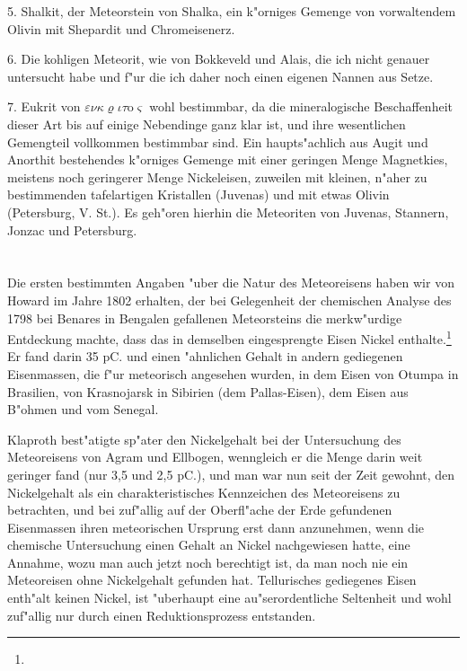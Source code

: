 \documentclass[a4paper, 11pt, oneside]{article}
\begin{document}
5. Shalkit, der Meteorstein von Shalka, ein k"orniges Gemenge von vorwaltendem Olivin mit Shepardit und Chromeisenerz.

6. Die kohligen Meteorit, wie von Bokkeveld und Alais, die ich nicht genauer untersucht habe und f"ur die ich daher noch einen eigenen Nannen aus Setze.

7. Eukrit von $\varepsilon\nu\kappa\varrho\iota\tau$o$\varsigma$ wohl bestimmbar, da die mineralogische Beschaffenheit dieser Art bis auf einige Nebendinge ganz klar ist, und ihre wesentlichen Gemengteil vollkommen bestimmbar sind. Ein haupts"achlich aus Augit und Anorthit bestehendes k"orniges Gemenge mit einer geringen Menge Magnetkies, meistens noch geringerer Menge Nickeleisen, zuweilen mit kleinen, n"aher zu bestimmenden tafelartigen Kristallen (Juvenas) und mit etwas Olivin (Petersburg, V. St.). Es geh"oren hierhin die Meteoriten von Juvenas, Stannern, Jonzac und Petersburg.
\clearpage
\section{}
\paragraph{}
Die ersten bestimmten Angaben "uber die Natur des Meteoreisens haben wir von Howard im Jahre 1802 erhalten, der bei Gelegenheit der chemischen Analyse des 1798 bei Benares in Bengalen gefallenen Meteorsteins die merkw"urdige Entdeckung machte, dass das in demselben eingesprengte Eisen Nickel enthalte.\footnote{} Er fand darin 35 pC. und einen "ahnlichen Gehalt in andern gediegenen Eisenmassen, die f"ur meteorisch angesehen wurden, in dem Eisen von Otumpa in Brasilien, von Krasnojarsk in Sibirien (dem Pallas-Eisen), dem Eisen aus B"ohmen und vom Senegal.

Klaproth best"atigte sp"ater den Nickelgehalt bei der Untersuchung des Meteoreisens von Agram und Ellbogen, wenngleich er die Menge darin weit geringer fand (nur 3,5 und 2,5 pC.), und man war nun seit der Zeit gewohnt, den Nickelgehalt als ein charakteristisches Kennzeichen des Meteoreisens zu betrachten, und bei zuf"allig auf der Oberfl"ache der Erde gefundenen Eisenmassen ihren meteorischen Ursprung erst dann anzunehmen, wenn die chemische Untersuchung einen Gehalt an Nickel nachgewiesen hatte, eine Annahme, wozu man auch jetzt noch berechtigt ist, da man noch nie ein Meteoreisen ohne Nickelgehalt gefunden hat. Tellurisches gediegenes Eisen enth"alt keinen Nickel, ist "uberhaupt eine au"serordentliche Seltenheit und wohl zuf"allig nur durch einen Reduktionsprozess entstanden.
\end{document}
